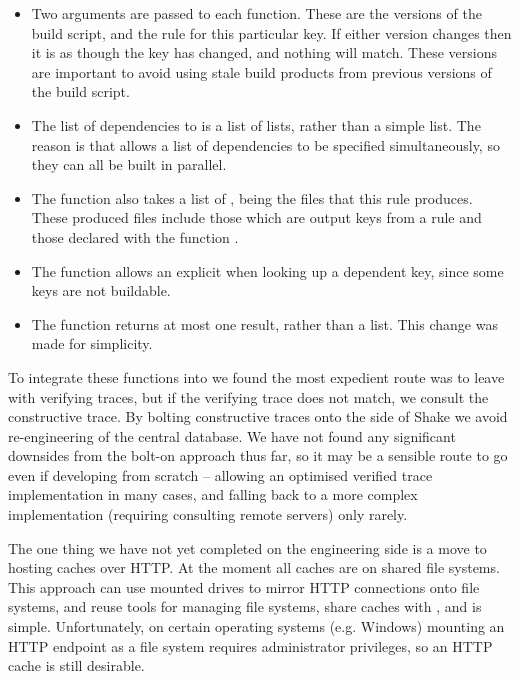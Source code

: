 \begin{itemize}
\item Two  arguments are passed to each function. These are
      the versions of the build script, and the rule for this particular key. If
      either version changes then it is as though the key has changed, and
      nothing will match. These versions are important to avoid using stale
      build products from previous versions of the build script.
\item The list of dependencies to  is a list of lists, rather than
      a simple list. The reason is that \Shake allows a list of dependencies to
      be specified simultaneously, so they can all be built in parallel.
\item The  function also takes a list of , being the
      files that this rule produces. These produced files include those which
      are output keys from a rule and those declared with the function
      .
\item The  function allows an explicit  when looking
      up a dependent key, since some keys are not buildable.
\item The  function returns at most one result, rather than a
      list. This change was made for simplicity.
\end{itemize}

To integrate these functions into \Shake we found the most expedient route was
to leave \Shake with verifying traces, but if the verifying trace does not
match, we consult the constructive trace. By bolting constructive traces onto
the side of Shake we avoid re-engineering of the central database. We have not
found any significant downsides from the bolt-on approach thus far, so it may be
a sensible route to go even if developing from scratch -- allowing an optimised
verified trace implementation in many cases, and falling back to a more complex
implementation (requiring consulting remote servers) only rarely.

The one thing we have not yet completed on the engineering side is a move to
hosting caches over HTTP. At the moment all caches are on shared file systems.
This approach can use mounted drives to mirror HTTP connections onto file
systems, and reuse tools for managing file systems, share caches with
, and is simple. Unfortunately, on certain operating systems (e.g.
Windows) mounting an HTTP endpoint as a file system requires administrator
privileges, so an HTTP cache is still desirable.

